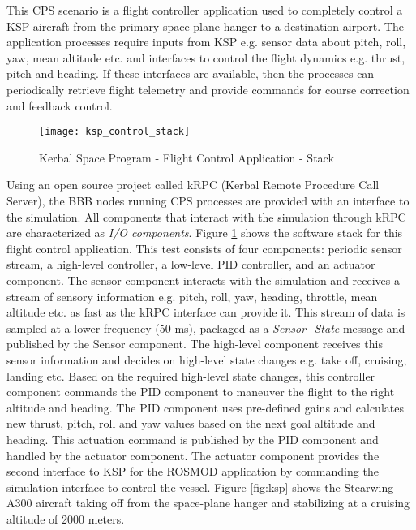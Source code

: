 This CPS scenario is a flight controller application used to completely control a KSP aircraft from the primary space-plane hanger to a destination airport. The application processes require inputs from KSP e.g. sensor data about pitch, roll, yaw, mean altitude etc. and interfaces to control the flight dynamics e.g. thrust, pitch and heading. If these interfaces are available, then the processes can periodically retrieve flight telemetry and provide commands for course correction and feedback control.

\begin{figure}[h]
	\centering
	\texttt{[image: ksp\_control\_stack]}
	\caption{Kerbal Space Program - Flight Control Application - Stack}
	\label{fig:ksp_control_stack}
\end{figure} 
\FloatBarrier 

Using an open source project called kRPC \cite{kRPC} (Kerbal Remote Procedure Call Server), the BBB nodes running CPS processes are provided with an interface to the simulation. All components that interact with the simulation through kRPC are characterized as \emph{I/O components}. Figure \ref{fig:ksp_control_stack} shows the software stack for this flight control application. This test consists of four components: periodic sensor stream, a high-level controller, a low-level PID controller, and an actuator component. The sensor component interacts with the simulation and receives a stream of sensory information e.g. pitch, roll, yaw, heading, throttle, mean altitude etc. as fast as the kRPC interface can provide it. This stream of data is sampled at a lower frequency (50 ms), packaged as a \emph{Sensor\_State} message and published by the Sensor component. The high-level component receives this sensor information and decides on high-level state changes e.g. take off, cruising, landing etc. Based on the required high-level state changes, this controller component commands the PID component to maneuver the flight to the right altitude and heading. The PID component uses pre-defined gains and calculates new thrust, pitch, roll and yaw values based on the next goal altitude and heading. This actuation command is published by the PID component and handled by the actuator component. The actuator component provides the second interface to KSP for the ROSMOD application by commanding the simulation interface to control the vessel. Figure \ref{fig:ksp} shows the Stearwing A300 aircraft taking off from the space-plane hanger and stabilizing at a cruising altitude of 2000 meters. 

